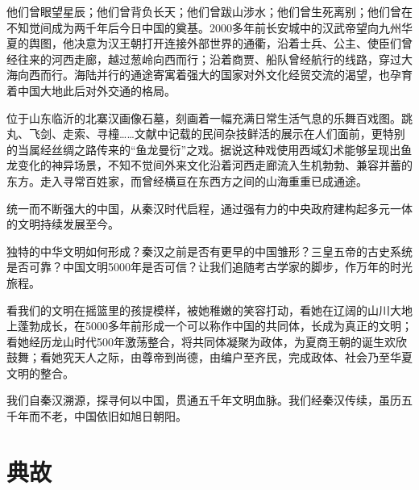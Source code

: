 他们曾眼望星辰；他们曾背负长天；他们曾跋山涉水；他们曾生死离别；他们曾在不知觉间成为两千年后今日中国的奠基。2000多年前长安城中的汉武帝望向九州华夏的舆图，他决意为汉王朝打开连接外部世界的通衢，沿着士兵、公主、使臣们曾经往来的河西走廊，越过葱岭向西而行；沿着商贾、船队曾经航行的线路，穿过大海向西而行。海陆并行的通途寄寓着强大的国家对外文化经贸交流的渴望，也孕育着中国大地此后对外交通的格局。

位于山东临沂的北寨汉画像石墓，刻画着一幅充满日常生活气息的乐舞百戏图。跳丸、飞剑、走索、寻橦……文献中记载的民间杂技鲜活的展示在人们面前，更特别的当属经丝绸之路传来的“鱼龙曼衍”之戏。据说这种戏使用西域幻术能够呈现出鱼龙变化的神异场景，不知不觉间外来文化沿着河西走廊流入生机勃勃、兼容并蓄的东方。走入寻常百姓家，而曾经横亘在东西方之间的山海重重已成通途。

统一而不断强大的中国，从秦汉时代启程，通过强有力的中央政府建构起多元一体的文明持续发展至今。

独特的中华文明如何形成？秦汉之前是否有更早的中国雏形？三皇五帝的古史系统是否可靠？中国文明5000年是否可信？让我们追随考古学家的脚步，作万年的时光旅程。

看我们的文明在摇篮里的孩提模样，被她稚嫩的笑容打动，看她在辽阔的山川大地上蓬勃成长，在5000多年前形成一个可以称作中国的共同体，长成为真正的文明；看她经历龙山时代500年激荡整合，将共同体凝聚为政体，为夏商王朝的诞生欢欣鼓舞；看她究天人之际，由尊帝到尚德，由编户至齐民，完成政体、社会乃至华夏文明的整合。

我们自秦汉溯源，探寻何以中国，贯通五千年文明血脉。我们经秦汉传续，虽历五千年而不老，中国依旧如旭日朝阳。


\section{典故}

